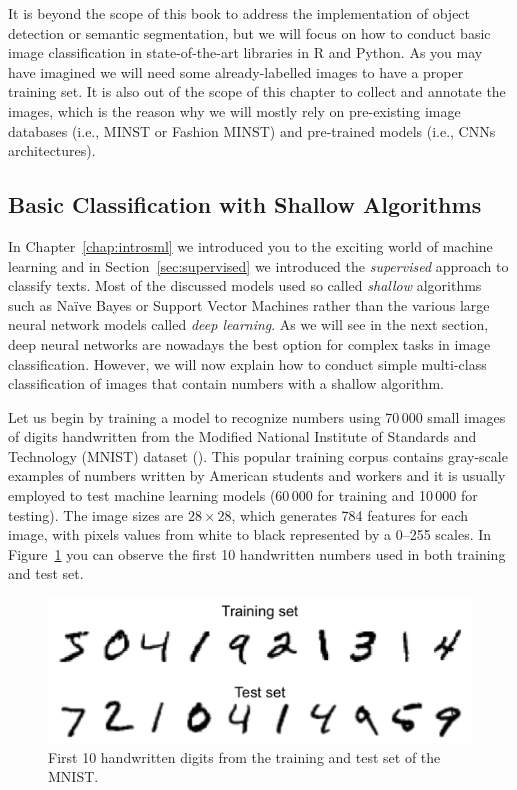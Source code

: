 It is beyond the scope of this book to address the implementation of object detection or semantic segmentation, but we will focus on how to conduct basic image classification in state-of-the-art libraries in R and Python. As you may have imagined we will need some already-labelled images to have a proper training set. It is also out of the scope of this chapter to collect and annotate the images, which is the reason why we will mostly rely on pre-existing image databases (i.e., MINST or Fashion MINST) and pre-trained models (i.e., CNNs architectures).

\subsection{Basic Classification with Shallow Algorithms}
\label{subsec:shallow}

In Chapter~\ref{chap:introsml} we introduced you to the exciting world of machine learning and in Section~\ref{sec:supervised}  we introduced the \textit{supervised} approach to classify texts. Most of the discussed models used so called \textit{shallow} algorithms such as Na\"ive Bayes or Support Vector Machines rather than the various large neural network models called \emph{deep learning}. As we will see in the next section, deep neural networks are nowadays the best option for complex tasks in image classification. However, we will now explain how to conduct simple multi-class classification of images that contain numbers with a shallow algorithm.

Let us begin by training a model to recognize numbers using 70\,000 small images of digits handwritten from the Modified National Institute of Standards and Technology (MNIST) dataset  (\cite{lecun1998gradient}). This popular training corpus contains gray-scale examples of numbers written by American students and workers and it is usually employed to test machine learning models (60\,000 for training and 10\,000 for testing). The image sizes are $28 \times 28$, which generates 784 features for each image, with pixels values from white to black represented by a 0--255 scales. In Figure~\ref{fig:numbers} you can observe the first 10 handwritten numbers used in both training and test set.

\begin{figure}
\centering
\includegraphics[width=0.9\linewidth]{figures/ch15_numbers.png}
\caption{First 10 handwritten digits from the training and test set of the MNIST.}
\label{fig:numbers}
\end{figure}

